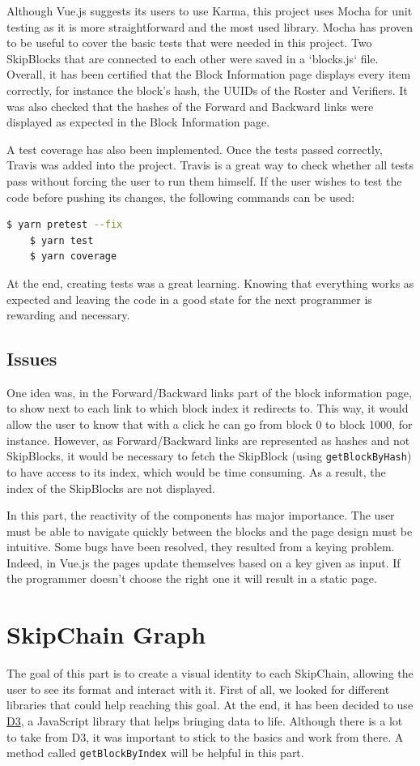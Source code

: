 \documentclass[11pt, a4paper, twoside, openright]{article} %
\begin{document}
{Although Vue.js suggests its users to use Karma, this project uses Mocha for unit testing as it is more straightforward and the most used library.
Mocha has proven to be useful to cover the basic tests that were needed in this project. Two SkipBlocks that are connected to each other were saved in a `blocks.js` file. Overall, it has been certified that the Block Information page displays every item correctly, for instance the block's hash, the UUIDs of the Roster and Verifiers. It was also checked that the hashes of the Forward and Backward links were displayed as expected in the Block Information page.

A test coverage has also been implemented. Once the tests passed correctly, Travis was added into the project. Travis is a great way to check whether all tests pass without forcing the user to run them himself.
If the user wishes to test the code before pushing its changes, the following commands can be used:
\begin{lstlisting}[language=bash]
    $ yarn pretest --fix
    $ yarn test
    $ yarn coverage
    \end{lstlisting}
    
At the end, creating tests was a great learning. Knowing that everything works as expected and leaving the code in a good state for the next programmer is rewarding and necessary.
\subsection{Issues}
One idea was, in the Forward/Backward links part of the block information page, to show next to each link to which block index it redirects to. This way, it would allow the user to know that with a click he can go from block 0 to block 1000, for instance. However, as Forward/Backward links are represented as hashes and not SkipBlocks, it would be necessary to fetch the SkipBlock (using \verb|getBlockByHash|) to have access to its index, which would be time consuming. As a result, the index of the SkipBlocks are not displayed.

In this part, the reactivity of the components has major importance. The user must be able to navigate quickly between the blocks and the page design must be intuitive. Some bugs have been resolved, they resulted from a keying problem. Indeed, in Vue.js the pages update themselves based on a key given as input. If the programmer doesn't choose the right one it will result in a static page. 
\section{SkipChain Graph}
The goal of this part is to create a visual identity to each SkipChain, allowing the user to see its format and interact with it. 
First of all, we looked for different libraries that could help reaching this goal. At the end, it has been decided to use \href{https://d3js.org/}{D3}, a JavaScript library that helps bringing data to life. Although there is a lot to take from D3, it was important to stick to the basics and work from there. A method called \verb|getBlockByIndex| will be helpful in this part.
}
\end{document}
